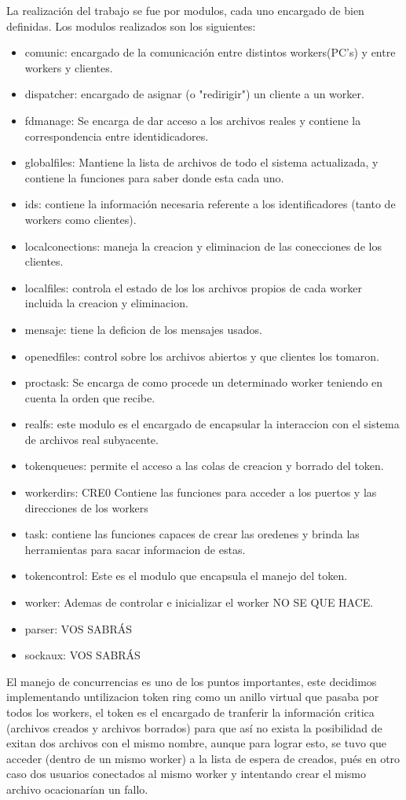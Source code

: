 \documentclass[11pt]{article}
\begin{document}
La realización del trabajo se fue por modulos, cada uno encargado de bien definidas. Los modulos realizados son los siguientes:
\begin{itemize}
\item comunic: encargado de la comunicación entre distintos workers(PC's) y entre workers y clientes.
\item dispatcher: encargado de asignar (o "redirigir") un cliente a un worker.
\item fdmanage: Se encarga de dar acceso a los archivos reales y contiene la correspondencia entre identidicadores.
\item globalfiles: Mantiene la lista de archivos de todo el sistema actualizada, y contiene la funciones para saber donde esta cada uno.
\item ids: contiene la información necesaria referente a los identificadores (tanto de workers como clientes).
\item localconections: maneja la creacion y eliminacion de las conecciones de los clientes.
\item localfiles: controla el estado de los los archivos propios de cada worker incluida la creacion y eliminacion.
\item mensaje: tiene la deficion de los mensajes usados.
\item openedfiles: control sobre los archivos abiertos y que clientes los tomaron.
\item proctask: Se encarga de como procede un determinado worker teniendo en cuenta la orden que recibe.
\item realfs: este modulo es el encargado de encapsular la interaccion con el sistema de archivos real subyacente.
\item tokenqueues: permite el acceso a las colas de creacion y borrado del token.
\item workerdirs: CRE0 Contiene las funciones para acceder a los puertos y las direcciones de los workers
\item task: contiene las funciones capaces de crear las oredenes y brinda las herramientas para sacar informacion de estas.
\item tokencontrol: Este es el modulo que encapsula el manejo del token.
\item worker: Ademas de controlar e inicializar el worker NO SE QUE HACE.
\item parser: VOS SABRÁS
\item sockaux: VOS SABRÁS
\end{itemize}

El manejo de concurrencias es uno de los puntos importantes, este decidimos implementando untilizacion token ring como un anillo virtual que pasaba por todos los workers, el token es el encargado de tranferir la información critica (archivos creados y archivos borrados) para que así no exista la posibilidad de exitan dos archivos con el mismo nombre, aunque para lograr esto, se tuvo que acceder (dentro de un mismo worker) a la lista de espera de creados, pués en otro caso dos usuarios conectados al mismo worker y intentando crear el mismo archivo ocacionarían un fallo.
\end{document}
